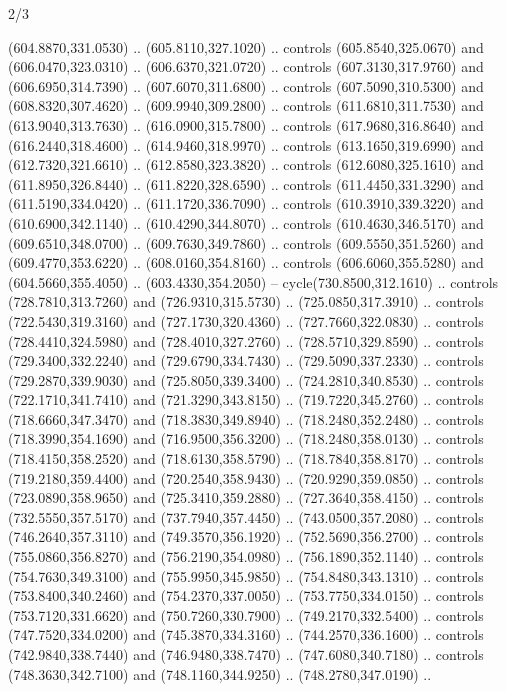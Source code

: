 \begin{flagdescription}{2/3}
\begin{scope}[xshift=\flaglength/2,yshift=\flagwidth/2,scale=\flagwidth/341]
\begin{scope}[xshift=-20mm,yshift=38.3mm,scale=0.1565]
\begin{scope}[y=0.80pt, x=0.80pt, yscale=-1, xscale=1,draw=gold,fill=white]
\begin{scope}[line join=round,line cap=round,line width=1.016\lw]
\begin{scope}[fill]
  (604.8870,331.0530) .. (605.8110,327.1020) .. controls (605.8540,325.0670) and
  (606.0470,323.0310) .. (606.6370,321.0720) .. controls (607.3130,317.9760) and
  (606.6950,314.7390) .. (607.6070,311.6800) .. controls (607.5090,310.5300) and
  (608.8320,307.4620) .. (609.9940,309.2800) .. controls (611.6810,311.7530) and
  (613.9040,313.7630) .. (616.0900,315.7800) .. controls (617.9680,316.8640) and
  (616.2440,318.4600) .. (614.9460,318.9970) .. controls (613.1650,319.6990) and
  (612.7320,321.6610) .. (612.8580,323.3820) .. controls (612.6080,325.1610) and
  (611.8950,326.8440) .. (611.8220,328.6590) .. controls (611.4450,331.3290) and
  (611.5190,334.0420) .. (611.1720,336.7090) .. controls (610.3910,339.3220) and
  (610.6900,342.1140) .. (610.4290,344.8070) .. controls (610.4630,346.5170) and
  (609.6510,348.0700) .. (609.7630,349.7860) .. controls (609.5550,351.5260) and
  (609.4770,353.6220) .. (608.0160,354.8160) .. controls (606.6060,355.5280) and
  (604.5660,355.4050) .. (603.4330,354.2050) -- cycle(730.8500,312.1610) ..
  controls (728.7810,313.7260) and (726.9310,315.5730) .. (725.0850,317.3910) ..
  controls (722.5430,319.3160) and (727.1730,320.4360) .. (727.7660,322.0830) ..
  controls (728.4410,324.5980) and (728.4010,327.2760) .. (728.5710,329.8590) ..
  controls (729.3400,332.2240) and (729.6790,334.7430) .. (729.5090,337.2330) ..
  controls (729.2870,339.9030) and (725.8050,339.3400) .. (724.2810,340.8530) ..
  controls (722.1710,341.7410) and (721.3290,343.8150) .. (719.7220,345.2760) ..
  controls (718.6660,347.3470) and (718.3830,349.8940) .. (718.2480,352.2480) ..
  controls (718.3990,354.1690) and (716.9500,356.3200) .. (718.2480,358.0130) ..
  controls (718.4150,358.2520) and (718.6130,358.5790) .. (718.7840,358.8170) ..
  controls (719.2180,359.4400) and (720.2540,358.9430) .. (720.9290,359.0850) ..
  controls (723.0890,358.9650) and (725.3410,359.2880) .. (727.3640,358.4150) ..
  controls (732.5550,357.5170) and (737.7940,357.4450) .. (743.0500,357.2080) ..
  controls (746.2640,357.3110) and (749.3570,356.1920) .. (752.5690,356.2700) ..
  controls (755.0860,356.8270) and (756.2190,354.0980) .. (756.1890,352.1140) ..
  controls (754.7630,349.3100) and (755.9950,345.9850) .. (754.8480,343.1310) ..
  controls (753.8400,340.2460) and (754.2370,337.0050) .. (753.7750,334.0150) ..
  controls (753.7120,331.6620) and (750.7260,330.7900) .. (749.2170,332.5400) ..
  controls (747.7520,334.0200) and (745.3870,334.3160) .. (744.2570,336.1600) ..
  controls (742.9840,338.7440) and (746.9480,338.7470) .. (747.6080,340.7180) ..
  controls (748.3630,342.7100) and (748.1160,344.9250) .. (748.2780,347.0190) ..

\end{scope}
\end{scope}
\end{scope}
\end{scope}
\end{scope}
\end{flagdescription}
